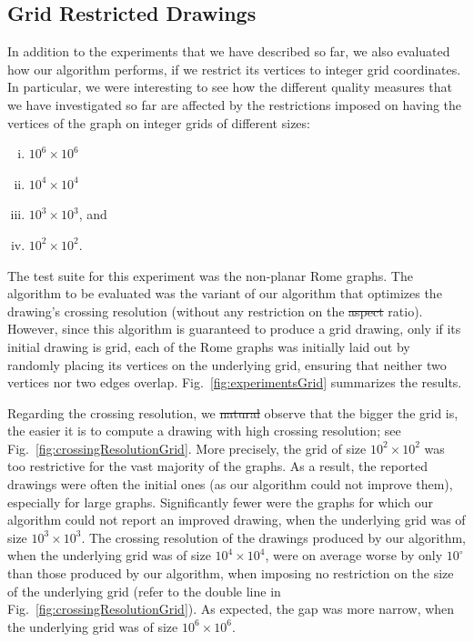 \documentclass{comjnl}
\providecommand{\DIFaddtex}[1]{{\protect\color{blue}\uwave{#1}}} %
\providecommand{\DIFdeltex}[1]{{\protect\color{red}\sout{#1}}}                      %
\providecommand{\DIFaddbegin}{} %
\providecommand{\DIFaddend}{} %
\providecommand{\DIFdelbegin}{} %
\providecommand{\DIFdelend}{} %
\providecommand{\DIFadd}[1]{\texorpdfstring{\DIFaddtex{#1}}{#1}} %
\providecommand{\DIFdel}[1]{\texorpdfstring{\DIFdeltex{#1}}{}} %
\newcommand{\DIFscaledelfig}{0.5}
\newlength{\DIFdelgraphicswidth} %
\newlength{\DIFdelgraphicsheight} %
\newcommand{\DIFaddincludegraphics}[2][]{{\color{blue}\fbox{\DIFOincludegraphics[#1]{#2}}}} %
\newcommand{\DIFdelincludegraphics}[2][]{%
\sbox{\DIFdelgraphicsbox}{\DIFOincludegraphics[#1]{#2}}%
\settoboxwidth{\DIFdelgraphicswidth}{\DIFdelgraphicsbox} %
\settoboxtotalheight{\DIFdelgraphicsheight}{\DIFdelgraphicsbox} %
\scalebox{\DIFscaledelfig}{%
\parbox[b]{\DIFdelgraphicswidth}{\usebox{\DIFdelgraphicsbox}\\[-\baselineskip] \rule{\DIFdelgraphicswidth}{0em}}\llap{\resizebox{\DIFdelgraphicswidth}{\DIFdelgraphicsheight}{%
\setlength{\unitlength}{\DIFdelgraphicswidth}%
\begin{picture}(1,1)%
\thicklines\linethickness{2pt} %
{\color[rgb]{1,0,0}\put(0,0){\framebox(1,1){}}}%
{\color[rgb]{1,0,0}\put(0,0){\line( 1,1){1}}}%
{\color[rgb]{1,0,0}\put(0,1){\line(1,-1){1}}}%
\end{picture}%
}\hspace*{3pt}}} %
} %
\DeclareRobustCommand{\DIFaddbegin}{\DIFOaddbegin \let\includegraphics\DIFaddincludegraphics} %
\DeclareRobustCommand{\DIFaddend}{\DIFOaddend \let\includegraphics\DIFOincludegraphics} %
\DeclareRobustCommand{\DIFdelbegin}{\DIFOdelbegin \let\includegraphics\DIFdelincludegraphics} %
\DeclareRobustCommand{\DIFdelend}{\DIFOaddend \let\includegraphics\DIFOincludegraphics} %
\begin{document}
\subsection{Grid Restricted Drawings}
\label{ssec:grid}

In addition to the experiments that we have described so far, we also evaluated how our algorithm performs, if we restrict its vertices to integer grid coordinates. In particular, we were interesting to see how the different quality measures that we have investigated so far are affected by the restrictions imposed on having the vertices of the graph on integer grids of different sizes:

\begin{enumerate}[(i)]
\item $10^6 \times 10^6$
\item $10^4 \times 10^4$
\item $10^3 \times 10^3$, and
\item $10^2 \times 10^2$.
\end{enumerate}

The test suite for this experiment was the non-planar Rome graphs. The algorithm to be evaluated was the variant of our algorithm that optimizes the drawing's crossing resolution (without any restriction on the \DIFdelbegin \DIFdel{aspect }\DIFdelend \DIFaddbegin \DIFadd{edge-length }\DIFaddend ratio). However, since this algorithm is guaranteed to produce a grid drawing, only if its initial drawing is grid, each of the Rome graphs was initially laid out by randomly placing its vertices on the underlying grid, ensuring that neither two vertices nor two edges overlap. Fig.~\ref{fig:experimentsGrid} summarizes the results.

Regarding the crossing resolution, we \DIFdelbegin \DIFdel{natural }\DIFdelend \DIFaddbegin \DIFadd{naturally }\DIFaddend observe that the bigger the grid is, the easier it is to compute a drawing with high crossing resolution; see Fig.~\ref{fig:crossingResolutionGrid}. More precisely, the grid of size $10^2 \times 10^2$ was too restrictive for the vast majority of the graphs. As a result, the reported drawings were often the initial ones (as our algorithm could not improve them), especially for large graphs. Significantly fewer were the graphs for which our algorithm could not report an improved drawing, when the underlying grid was of size $10^3 \times 10^3$. The crossing resolution of the drawings produced by our algorithm, when the underlying grid was of size $10^4 \times 10^4$, were on average worse by only $10^\circ$ than those produced by our algorithm, when imposing no restriction on the size of the underlying grid (refer to the double line in Fig.~\ref{fig:crossingResolutionGrid}). As expected, the gap was more narrow, when the underlying grid was of size $10^6 \times 10^6$.
\end{document}
